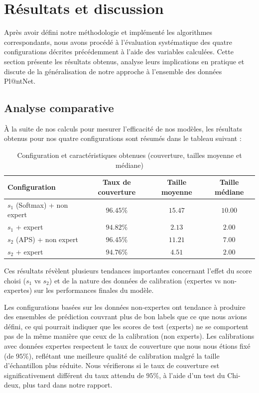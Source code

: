 \documentclass[a4paper,12pt]{article}
\begin{document}
\section{Résultats et discussion}

Après avoir défini notre méthodologie et implémenté les algorithmes correspondants, nous avons procédé à l'évaluation systématique des quatre configurations décrites précédemment à l'aide des variables calculées. Cette section présente les résultats obtenus, analyse leurs implications en pratique et discute de la généralisation de notre approche à l'ensemble des données Pl@ntNet.


\subsection{Analyse comparative}

À la suite de nos calculs pour mesurer l'efficacité de nos modèles, les résultats obtenus pour nos quatre configurations sont résumés dans le tableau suivant :

\begin{table}[H]
\centering
\begin{tabular}{|l|c|c|c|}
    \hline
    \textbf{Configuration} & \textbf{Taux de couverture} & \textbf{Taille moyenne} & \textbf{Taille médiane} \\
    \hline
    $s_1$ (Softmax) + non expert & $96.45\%$ & $15.47$ & $10.00$ \\
    $s_1$ + expert & $94.82\%$ & $2.13$ & $2.00$ \\
    $s_2$ (APS) + non expert & $96.45\%$ & $11.21$ & $7.00$ \\
    $s_2$ + expert & $94.76\%$ & $4.51$ & $2.00$ \\
    \hline
    \end{tabular}
\caption{Configuration et caractéristiques obtenues (couverture, tailles moyenne et médiane)}
\label{tab3}
\end{table}
    
Ces résultats révèlent plusieurs tendances importantes concernant l'effet du score choisi ($s_1$ vs $s_2$) et de la nature des données de calibration (expertes vs non-expertes) sur les performances finales du modèle.

\vspace{0.2cm}

Les configurations basées sur les données non-expertes ont tendance à produire des ensembles de prédiction couvrant plus de bon labels que ce que nous avions défini, ce qui pourrait indiquer que les scores de test (experts) ne se comportent pas de la même manière que ceux de la calibration (non experts). Les calibrations avec données expertes respectent le taux de couverture que nous nous étions fixé (de $95\%$), reflétant une meilleure qualité de calibration malgré la taille d’échantillon plus réduite. Nous vérifierons si le taux de couverture est significativement différent du taux attendu de $95\%$, à l’aide d’un test du Chi-deux, plus tard dans notre rapport.
\end{document}
